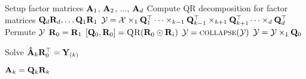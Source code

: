 \begin{algorithmic}[1]
      \State Setup factor matrices  $\mat{A}_1$, $\mat{A}_2$, $\dots$, $\mat{A}_d$
      \State Compute QR decomposition for factor matrices $\mat{Q}_d\mat{R}_d, \dots \mat{Q}_1\mat{R}_1$
        \State $\T{Y} =  \T{X} \times_1 \mat{Q}_1^\top \dots \times_{k-1} \mat{Q}_{k-1}^\top \times_{k+1} \mat{Q}_{k+1}^\top \dots \times_d \mat{Q}_d^\top$ \label{l:Pair-TTM} 
        \State Permute $\T[]{Y}$  
        \State $\mat{R}_0 = \mat{R}_1$ 
        \State $[\mat{Q}_0,\mat{R}_0] = \Call{QR}{\mat{R}_0 \odot \mat{R}_i}$
        \State $\T{Y}= \Call{collapse}{\T{Y}}$
        \State $\T[]{Y} = \T[]{Y} \times_1 \mat{Q}_0$  \label{l:pair-R-TTM}

        \EndFor
              
      \State Solve $  \mat{\hat{A}}_k\mat{R}_0^\top = \mat{Y}_{(k)}$ 
      
      \State $\mat{A}_k = \mat{Q}_k\mat{R}_k$       
      \EndFor
      \EndWhile
    \EndFunction
  \end{algorithmic}